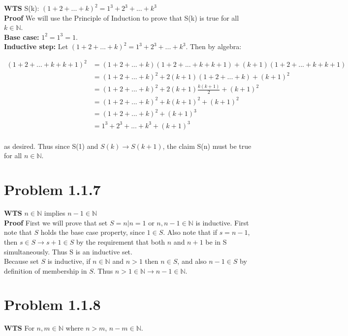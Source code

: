 \documentclass[10pt]{article} %
\begin{document}
\textbf{WTS} S(k): $(1 + 2 + ... + k)^2 = 1^3 + 2^3 + ... + k^3$\\

\textbf{Proof} We will use the Principle of Induction to prove that S(k) is true for all $k \in \mathbb{N}$.\\

\textbf{Base case:} $1^2 = 1^3 = 1$.\\

\textbf{Inductive step:} Let $(1 + 2 + ... + k)^2 = 1^3 + 2^3 + ... + k^3$. Then by algebra:

\begin{align*}
  (1 + 2 + ... + k + k + 1)^2 &= (1 + 2 + ... + k)(1 + 2 + ... + k + k + 1) + (k + 1)(1 + 2 + ... + k + k + 1)\\
  &= (1 + 2 + ... + k)^2 + 2(k+1)(1 + 2 + ... + k) + (k + 1)^2\\
  &= (1 + 2 + ... + k)^2 + 2(k+1)\frac{k(k+1)}{2} + (k + 1)^2\\
  &= (1 + 2 + ... + k)^2 + k(k+1)^2 + (k + 1)^2\\
  &= (1 + 2 + ... + k)^2 + (k+1)^3\\
  &= 1^3 + 2^3 + ... + k^3 + (k+1)^3\\
\end{align*}

as desired. Thus since S(1) and $S(k) \rightarrow S(k+1)$, the claim S(n) must be true for all $n \in \mathbb{N}$.\\


\section{Problem 1.1.7}
\textbf{WTS} $n \in \mathbb{N}$ implies $n-1 \in \mathbb{N}$\\

\textbf{Proof} First we will prove that set $S = {n | n = 1 \mbox{ or } n, n-1 \in \mathbb{N}}$ is inductive. First note that $S$ holds the base case property, since $1 \in S$. Also note that if $s = n - 1$, then $s \in S \rightarrow s + 1 \in S$ by the requirement that both $n$ and $n+1$ be in S simultaneously. Thus S is an inductive set.\\

Because set $S$ is inductive, if $n \in \mathbb{N}$ and $n > 1$ then $n \in S$, and also $n-1 \in S$ by definition of membership in $S$. Thus $n > 1 \in \mathbb{N} \rightarrow n-1\in\mathbb{N}$.

\section{Problem 1.1.8}
\textbf{WTS} For $n,m \in \mathbb{N}$ where $n > m$, $n-m \in \mathbb{N}$.
\end{document}

